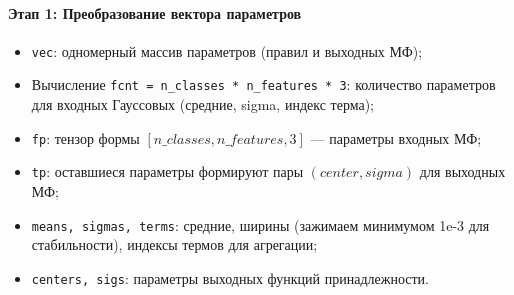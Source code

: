 \paragraph{Этап 1: Преобразование вектора параметров}
\begin{itemize}
  \item \texttt{vec}: одномерный массив параметров (правил и выходных МФ);
  \item Вычисление \texttt{fcnt = n\_classes * n\_features * 3}: количество параметров для входных Гауссовых (средние, sigma, индекс терма);
  \item \texttt{fp}: тензор формы \([n\_classes, n\_features, 3]\) — параметры входных МФ;
  \item \texttt{tp}: оставшиеся параметры формируют пары \((center, sigma)\) для выходных МФ;
  \item \texttt{means, sigmas, terms}: средние, ширины (зажимаем минимумом 1e-3 для стабильности), индексы термов для агрегации;
  \item \texttt{centers, sigs}: параметры выходных функций принадлежности.
\end{itemize}

